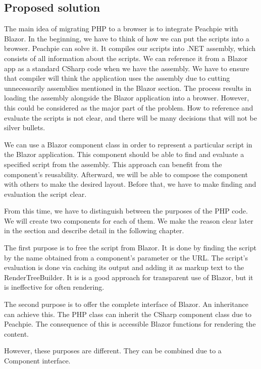 \subsection{Proposed solution}
The main idea of migrating PHP to a browser is to integrate Peachpie with Blazor.
In the beginning, we have to think of how we can put the scripts into a browser.
Peachpie can solve it.
It compiles our scripts into .NET assembly, which consists of all information about the scripts.
We can reference it from a Blazor app as a standard CSharp code when we have the assembly.
We have to ensure that compiler will think the application uses the assembly due to cutting unnecessarily assemblies mentioned in the Blazor section.
The process results in loading the assembly alongside the Blazor application into a browser.
However, this could be considered as the major part of the problem.
How to reference and evaluate the scripts is not clear, and there will be many decisions that will not be silver bullets.

We can use a Blazor component class in order to represent a particular script in the Blazor application.
This component should be able to find and evaluate a specified script from the assembly.
This approach can benefit from the component's reusability.
Afterward, we will be able to compose the component with others to make the desired layout.
Before that, we have to make finding and evaluation the script clear.

From this time, we have to distinguish between the purposes of the PHP code.
We will create two components for each of them.
We make the reason clear later in the section and describe detail in the following chapter.

The first purpose is to free the script from Blazor.
It is done by finding the script by the name obtained from a component's parameter or the URL.
The script's evaluation is done via caching its output and adding it as markup text to the RenderTreeBuilder.
It is is a good approach for transparent use of Blazor, but it is ineffective for often rendering.


The second purpose is to offer the complete interface of Blazor.
An inheritance can achieve this.
The PHP class can inherit the CSharp component class due to Peachpie.
The consequence of this is accessible Blazor functions for rendering the content.

However, these purposes are different. They can be combined due to a Component interface.







